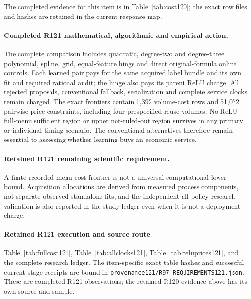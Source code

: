 The completed evidence for this item is in Table~\ref{tab:cost120}; the exact row files and hashes are retained in the current response map.

\paragraph{Completed R121 mathematical, algorithmic and empirical action.}
The complete comparison includes quadratic, degree-two and degree-three polynomial, spline, grid, equal-feature hinge and direct original-formula online controls. Each learned pair pays for the same acquired label bundle and its own fit and required rational audit; the hinge also pays its parent ReLU charge. All rejected proposals, conventional fallback, serialization and complete service clocks remain charged. The exact frontiers contain 1,392 volume-cost rows and 51,072 pairwise price constraints, including four prespecified reuse volumes. No ReLU full-menu sufficient region or upper not-ruled-out region survives in any primary or individual timing scenario. The conventional alternatives therefore remain essential to assessing whether learning buys an economic service.

\paragraph{Retained R121 remaining scientific requirement.}
A finite recorded-menu cost frontier is not a universal computational lower bound. Acquisition allocations are derived from measured process components, not separate observed standalone fits, and the independent all-policy research validation is also reported in the study ledger even when it is not a deployment charge.

\paragraph{Retained R121 execution and source route.}
Table~\ref{tab:fullcost121}, Table~\ref{tab:allclocks121}, Table~\ref{tab:reluprices121}, and the complete research ledger.
The item-specific exact table hashes and successful current-stage receipts are bound in \nolinkurl{provenance121/R97_REQUIREMENTS121.json}. These are completed R121 observations; the retained R120 evidence above has its own source and sample.
